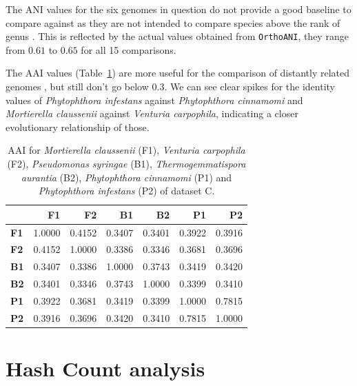 The ANI values for the six genomes in question do not provide a good baseline to
compare against as they are not intended to compare species above the rank of
genus \cite{leeOrthoANIImprovedAlgorithm2016}. This is reflected by the actual
values obtained from \texttt{OrthoANI}, they range from $0.61$ to $0.65$ for all
15 comparisons.

The AAI values (Table~\ref{ta:avodadoAAI}) are more useful for the comparison of
distantly related genomes \cite{rodriguez-rEnveomicsCollectionToolbox2016}, but
still don't go below $0.3$. We can see clear spikes for the identity values of
\textit{Phytophthora infestans} against \textit{Phytophthora cinnamomi} and
\textit{Mortierella claussenii} against \textit{Venturia carpophila}, indicating
a closer evolutionary relationship of those.

\begin{table}[]
  \centering
  \begin{tabular}{@{}lrrrrrr@{}}
  \toprule
              & \textbf{F1} & \textbf{F2} & \textbf{B1} & \textbf{B2} & \textbf{P1} & \textbf{P2} \\ \midrule
  \textbf{F1} & 1.0000      & 0.4152      & 0.3407      & 0.3401      & 0.3922      & 0.3916      \\
  \textbf{F2} & 0.4152      & 1.0000      & 0.3386      & 0.3346      & 0.3681      & 0.3696      \\
  \textbf{B1} & 0.3407      & 0.3386      & 1.0000      & 0.3743      & 0.3419      & 0.3420      \\
  \textbf{B2} & 0.3401      & 0.3346      & 0.3743      & 1.0000      & 0.3399      & 0.3410      \\
  \textbf{P1} & 0.3922      & 0.3681      & 0.3419      & 0.3399      & 1.0000      & 0.7815      \\
  \textbf{P2} & 0.3916      & 0.3696      & 0.3420      & 0.3410      & 0.7815      & 1.0000      \\ \bottomrule
  \end{tabular}
  \caption{AAI for \textit{Mortierella claussenii} (F1), \textit{Venturia
  carpophila} (F2), \textit{Pseudomonas syringae} (B1),
  \textit{Thermogemmatispora aurantia} (B2), \textit{Phytophthora cinnamomi}
  (P1) and \textit{Phytophthora infestans} (P2) of dataset C.}
  \label{ta:avodadoAAI}
\end{table}

\section{Hash Count analysis}
